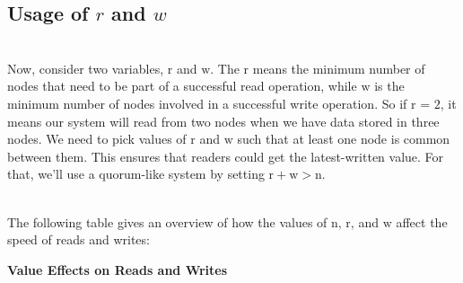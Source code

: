 \subsection[Usage of and ]{\texorpdfstring{Usage of \protect\hypertarget{katex_inline_MLUA3yeVQu6vWOktHoGaL}{}{{{\(r\)}}} and \protect\hypertarget{katex_inline_LbPQ-DuyzhjOb80Proihf}{}{{{\(w\)}}}}{Usage of r and w}}\label{TcL6cZ4lbaDDkeH1HBfin}
\\
Now, consider two variables, \protect{}\label{katex_inline_Kn_iHVdyThUAEnGczHiEH}{{{\(\text{r}\)}}} and \protect{}\label{katex_inline_yVjibCJHs04pr_SNWkBv9}{{{\(\text{w}\)}}}. The
\protect{}\label{katex_inline_S5wcT_keWHuJ6tTOkIONE}{{{\(\text{r}\)}}} means the minimum number of nodes that need to be part of a successful read operation, while \protect{}\label{katex_inline_fVZdYFGK38W0AbgWh6FOO}{{{\(\text{w}\)}}} is the minimum number of nodes involved in a successful write operation. So if \protect{}\label{katex_inline_O7l4_deUA0ChTGpqLvSGZ}{{{\(\text{r = 2}\)}}}, it means our system will read from two nodes when we have data stored in three nodes. We need to pick values of \protect{}\label{katex_inline_JDVC7DIWTGxtryMgfzEKU}{{{\(\text{r}\)}}} and \protect{}\label{katex_inline__pCfCBSFk7NOm_tQOKFm0}{{{\(\text{w}\)}}} such that at least one node is common between them. This ensures that readers could get the latest-written value. For that, we'll use a quorum-like system by setting \protect{}\label{katex_inline_J4OrS99GFLeC1SC6N9PYl}{{{\(\text{r} + \text{w} > \text{n}\)}}}.\\
\strut \\
The following table gives an overview of how the values of \protect{}\label{katex_inline_W4mo0nsKVSucd0qfG17PI}{{{\(\text{n, r,}\)}}} and \protect{}\label{katex_inline_1IWWGb3bj5LeoUS0_oxq4}{{{\(\text{w}\)}}} affect the speed of reads and writes:

\textbf{Value Effects on Reads and Writes}

\begin{table}[htbp]
\centering
\small
{}
\caption{Value Effects on Reads and Writes}
\end{table}


